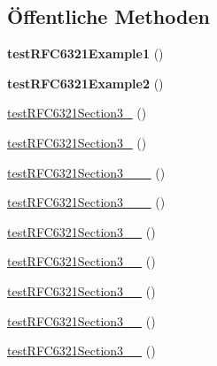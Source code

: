 \subsection*{Öffentliche Methoden}
\begin{DoxyCompactItemize}
\item 
\mbox{\label{class_sabre_1_1_v_object_1_1_parser_1_1_xml_test_ad033ceca309a32e662551940d4c7149d}} 
{\bfseries test\+R\+F\+C6321\+Example1} ()
\item 
\mbox{\label{class_sabre_1_1_v_object_1_1_parser_1_1_xml_test_ade835ae010691b1099b1e97ef2ba1b84}} 
{\bfseries test\+R\+F\+C6321\+Example2} ()
\item 
\mbox{\hyperlink{class_sabre_1_1_v_object_1_1_parser_1_1_xml_test_a1bc54e911ac7fff8c0e45e87baacbcb8}{test\+R\+F\+C6321\+Section3\+\_}} ()
\item 
\mbox{\hyperlink{class_sabre_1_1_v_object_1_1_parser_1_1_xml_test_aceb8a92f090fe4c3e6dc2b224d9f054d}{test\+R\+F\+C6321\+Section3\+\_}} ()
\item 
\mbox{\hyperlink{class_sabre_1_1_v_object_1_1_parser_1_1_xml_test_a3572a8c2cea3859b38018a2a67e210d0}{test\+R\+F\+C6321\+Section3\+\_\+\_\+\_}} ()
\item 
\mbox{\hyperlink{class_sabre_1_1_v_object_1_1_parser_1_1_xml_test_af566c4a0190e4bcd169dfd53a6c9dc3a}{test\+R\+F\+C6321\+Section3\+\_\+\_\+\_}} ()
\item 
\mbox{\hyperlink{class_sabre_1_1_v_object_1_1_parser_1_1_xml_test_ab68de1324a7427307b6ae387a29c0fae}{test\+R\+F\+C6321\+Section3\+\_\+\_}} ()
\item 
\mbox{\hyperlink{class_sabre_1_1_v_object_1_1_parser_1_1_xml_test_a41ab7130a755b7f13f59eaa034c4e173}{test\+R\+F\+C6321\+Section3\+\_\+\_}} ()
\item 
\mbox{\hyperlink{class_sabre_1_1_v_object_1_1_parser_1_1_xml_test_a2b526ff07b9e0069f357b5cbc4c42c97}{test\+R\+F\+C6321\+Section3\+\_\+\_}} ()
\item 
\mbox{\hyperlink{class_sabre_1_1_v_object_1_1_parser_1_1_xml_test_a23ffb73f1e4c9dd3d35daaa976a8ecb2}{test\+R\+F\+C6321\+Section3\+\_\+\_}} ()
\item 
\mbox{\hyperlink{class_sabre_1_1_v_object_1_1_parser_1_1_xml_test_af2c019c1d3bfa7ede03e98c833dfa608}{test\+R\+F\+C6321\+Section3\+\_\+\_}} ()
\item 

\end{DoxyCompactItemize}
